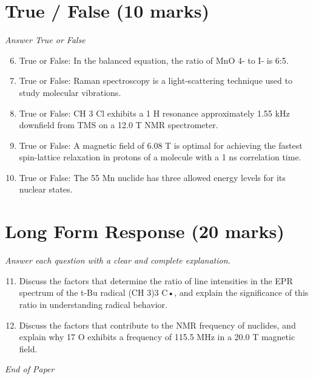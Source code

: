 \documentclass[12pt]{article}
\begin{document}
\section*{True / False (10 marks)}
\textit{Answer True or False}
\begin{enumerate}[label=\arabic*.]
\setcounter{enumi}{5}
\item True or False: In the balanced equation, the ratio of MnO 4- to I- is 6:5.
\item True or False: Raman spectroscopy is a light-scattering technique used to study molecular vibrations.
\item True or False: CH 3 Cl exhibits a 1 H resonance approximately 1.55 kHz downfield from TMS on a 12.0 T NMR spectrometer.
\item True or False: A magnetic field of 6.08 T is optimal for achieving the fastest spin-lattice relaxation in protons of a molecule with a 1 ns correlation time.
\item True or False: The 55 Mn nuclide has three allowed energy levels for its nuclear states.
\end{enumerate}

\section*{Long Form Response (20 marks)}
\textit{Answer each question with a clear and complete explanation.}
\begin{enumerate}[label=\arabic*.]
\setcounter{enumi}{10}
\item Discuss the factors that determine the ratio of line intensities in the EPR spectrum of the t-Bu radical (CH 3)3 C•, and explain the significance of this ratio in understanding radical behavior.
\item Discuss the factors that contribute to the NMR frequency of nuclides, and explain why 17 O exhibits a frequency of 115.5 MHz in a 20.0 T magnetic field.
\end{enumerate}

\vfill
\noindent\textit{End of Paper}
\end{document}
